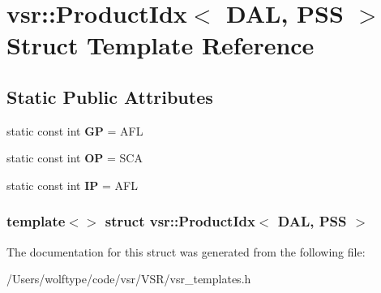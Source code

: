 \hypertarget{structvsr_1_1_product_idx_3_01_d_a_l_00_01_p_s_s_01_4}{\section{vsr\-:\-:Product\-Idx$<$ D\-A\-L, P\-S\-S $>$ Struct Template Reference}
\label{structvsr_1_1_product_idx_3_01_d_a_l_00_01_p_s_s_01_4}
}
\subsection*{Static Public Attributes}
\begin{DoxyCompactItemize}
\item 
\hypertarget{structvsr_1_1_product_idx_3_01_d_a_l_00_01_p_s_s_01_4_adb62e2160634bbbc6f61a6f02b494db0}{static const int {\bfseries G\-P} = A\-F\-L}\label{structvsr_1_1_product_idx_3_01_d_a_l_00_01_p_s_s_01_4_adb62e2160634bbbc6f61a6f02b494db0}

\item 
\hypertarget{structvsr_1_1_product_idx_3_01_d_a_l_00_01_p_s_s_01_4_ad343e3caef7556db9377d5d3e8082bc0}{static const int {\bfseries O\-P} = S\-C\-A}\label{structvsr_1_1_product_idx_3_01_d_a_l_00_01_p_s_s_01_4_ad343e3caef7556db9377d5d3e8082bc0}

\item 
\hypertarget{structvsr_1_1_product_idx_3_01_d_a_l_00_01_p_s_s_01_4_a17c77dd61f04104e3d706012c6e3e423}{static const int {\bfseries I\-P} = A\-F\-L}\label{structvsr_1_1_product_idx_3_01_d_a_l_00_01_p_s_s_01_4_a17c77dd61f04104e3d706012c6e3e423}

\end{DoxyCompactItemize}
\subsubsection*{template$<$$>$ struct vsr\-::\-Product\-Idx$<$ D\-A\-L, P\-S\-S $>$}



The documentation for this struct was generated from the following file\-:\begin{DoxyCompactItemize}
\item 
/\-Users/wolftype/code/vsr/\-V\-S\-R/vsr\-\_\-templates.\-h\end{DoxyCompactItemize}
